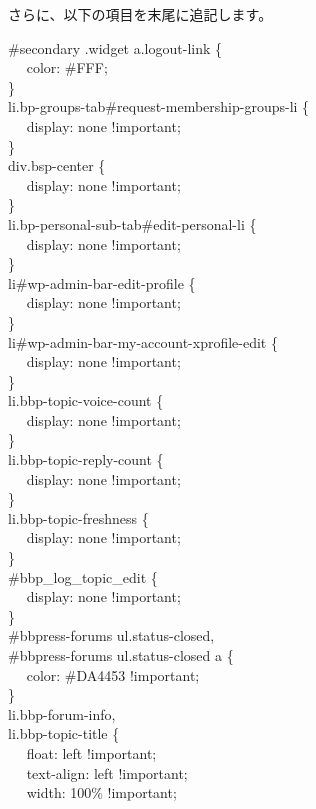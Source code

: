 \documentclass[titlepage,10pt,a4paper,uplatex]{jsbook}
\newenvironment{content}{\begin{shaded}\vspace{-1em}\raggedright\ttfamily\footnotesize\setlength{\baselineskip}{1.4em}}{\end{shaded}\vspace{-1em}}
\begin{document}
さらに、以下の項目を末尾に追記します。

\begin{content}
\#secondary .widget a.logout-link \{\\
 ~ ~color: \#FFF;\\
\}\\
li.bp-groups-tab\#request-membership-groups-li \{\\
 ~ ~display: none !important;\\
\}\\
div.bsp-center \{\\
 ~ ~display: none !important;\\
\}\\
li.bp-personal-sub-tab\#edit-personal-li \{\\
 ~ ~display: none !important;\\
\}\\
li\#wp-admin-bar-edit-profile \{\\
 ~ ~display: none !important;\\
\}\\
li\#wp-admin-bar-my-account-xprofile-edit \{\\
 ~ ~display: none !important;\\
\}\\
li.bbp-topic-voice-count \{\\
 ~ ~display: none !important;\\
\}\\
li.bbp-topic-reply-count \{\\
 ~ ~display: none !important;\\
\}\\
li.bbp-topic-freshness \{\\
 ~ ~display: none !important;\\
\}\\
\#bbp\_log\_topic\_edit \{\\
 ~ ~display: none !important;\\
\}\\
\#bbpress-forums ul.status-closed,\\
\#bbpress-forums ul.status-closed a \{\\
 ~ ~color: \#DA4453 !important;\\
\}\\
li.bbp-forum-info,\\
li.bbp-topic-title \{\\
 ~ ~float: left !important;\\
 ~ ~text-align: left !important;\\
 ~ ~width: 100\% !important;\\

\end{content}
\end{document}
